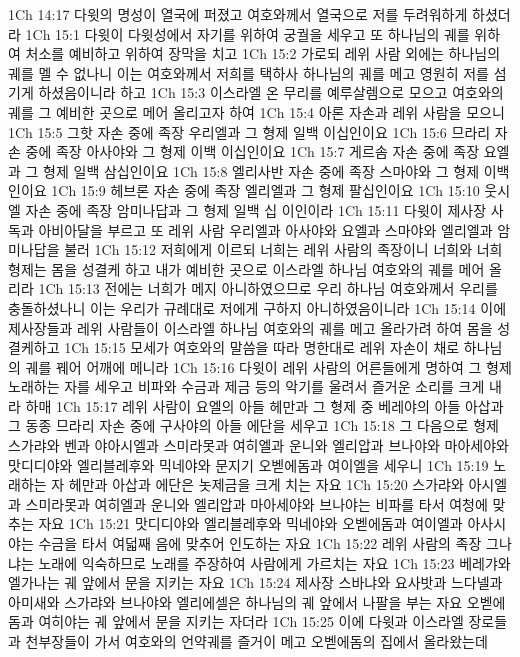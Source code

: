 1Ch 14:17  다윗의 명성이 열국에 퍼졌고 여호와께서 열국으로 저를 두려워하게 하셨더라
1Ch 15:1  다윗이 다윗성에서 자기를 위하여 궁궐을 세우고 또 하나님의 궤를 위하여 처소를 예비하고 위하여 장막을 치고
1Ch 15:2  가로되 레위 사람 외에는 하나님의 궤를 멜 수 없나니 이는 여호와께서 저희를 택하사 하나님의 궤를 메고 영원히 저를 섬기게 하셨음이니라 하고
1Ch 15:3  이스라엘 온 무리를 예루살렘으로 모으고 여호와의 궤를 그 예비한 곳으로 메어 올리고자 하여
1Ch 15:4  아론 자손과 레위 사람을 모으니
1Ch 15:5  그핫 자손 중에 족장 우리엘과 그 형제 일백 이십인이요
1Ch 15:6  므라리 자손 중에 족장 아사야와 그 형제 이백 이십인이요
1Ch 15:7  게르솜 자손 중에 족장 요엘과 그 형제 일백 삼십인이요
1Ch 15:8  엘리사반 자손 중에 족장 스마야와 그 형제 이백인이요
1Ch 15:9  헤브론 자손 중에 족장 엘리엘과 그 형제 팔십인이요
1Ch 15:10  웃시엘 자손 중에 족장 암미나답과 그 형제 일백 십 이인이라
1Ch 15:11  다윗이 제사장 사독과 아비아달을 부르고 또 레위 사람 우리엘과 아사야와 요엘과 스마야와 엘리엘과 암미나답을 불러
1Ch 15:12  저희에게 이르되 너희는 레위 사람의 족장이니 너희와 너희 형제는 몸을 성결케 하고 내가 예비한 곳으로 이스라엘 하나님 여호와의 궤를 메어 올리라
1Ch 15:13  전에는 너희가 메지 아니하였으므로 우리 하나님 여호와께서 우리를 충돌하셨나니 이는 우리가 규례대로 저에게 구하지 아니하였음이니라
1Ch 15:14  이에 제사장들과 레위 사람들이 이스라엘 하나님 여호와의 궤를 메고 올라가려 하여 몸을 성결케하고
1Ch 15:15  모세가 여호와의 말씀을 따라 명한대로 레위 자손이 채로 하나님의 궤를 꿰어 어깨에 메니라
1Ch 15:16  다윗이 레위 사람의 어른들에게 명하여 그 형제 노래하는 자를 세우고 비파와 수금과 제금 등의 악기를 울려서 즐거운 소리를 크게 내라 하매
1Ch 15:17  레위 사람이 요엘의 아들 헤만과 그 형제 중 베레야의 아들 아삽과 그 동종 므라리 자손 중에 구사야의 아들 에단을 세우고
1Ch 15:18  그 다음으로 형제 스가랴와 벤과 야아시엘과 스미라못과 여히엘과 운니와 엘리압과 브나야와 마아세야와 맛디디야와 엘리블레후와 믹네야와 문지기 오벧에돔과 여이엘을 세우니
1Ch 15:19  노래하는 자 헤만과 아삽과 에단은 놋제금을 크게 치는 자요
1Ch 15:20  스가랴와 아시엘과 스미라못과 여히엘과 운니와 엘리압과 마아세야와 브나야는 비파를 타서 여청에 맞추는 자요
1Ch 15:21  맛디디야와 엘리블레후와 믹네야와 오벧에돔과 여이엘과 아사시야는 수금을 타서 여덟째 음에 맞추어 인도하는 자요
1Ch 15:22  레위 사람의 족장 그나냐는 노래에 익숙하므로 노래를 주장하여 사람에게 가르치는 자요
1Ch 15:23  베레갸와 엘가나는 궤 앞에서 문을 지키는 자요
1Ch 15:24  제사장 스바냐와 요사밧과 느다넬과 아미새와 스가랴와 브나야와 엘리에셀은 하나님의 궤 앞에서 나팔을 부는 자요 오벧에돔과 여히야는 궤 앞에서 문을 지키는 자더라
1Ch 15:25  이에 다윗과 이스라엘 장로들과 천부장들이 가서 여호와의 언약궤를 즐거이 메고 오벧에돔의 집에서 올라왔는데
